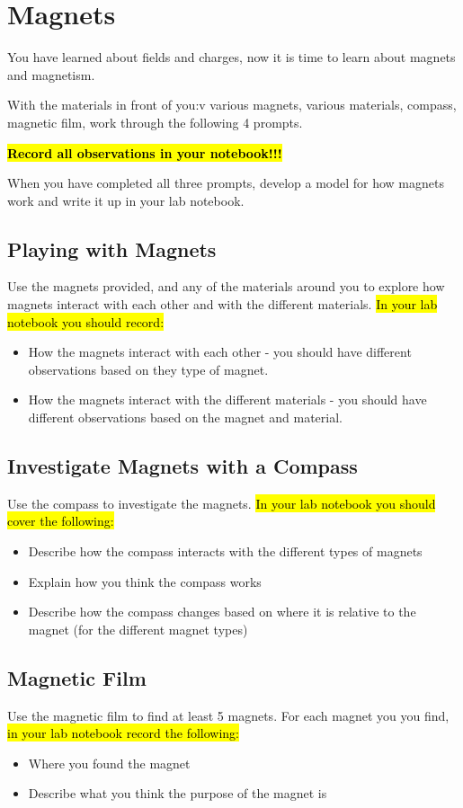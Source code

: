 \documentclass[14pt, fleqn, paper=letter, oneside]{scrartcl}
\begin{document}
\section{Magnets}
You have learned about fields and charges, now it is time to learn about magnets and magnetism.

With the materials in front of you:v
various magnets, various materials, compass, magnetic film,
work through the following 4 prompts.

\hl{\textbf{Record all observations in your notebook!!!}}

When you have completed all three prompts, develop a model for how magnets work and write it up in your lab notebook.

\begin{multicols}{2}

\subsection{Playing with Magnets}
Use the magnets provided, and any of the materials around you to explore how magnets interact with each other and with the different materials.
\hl{In your lab notebook you should record:}
\begin{itemize}
\item How the magnets interact with each other - you should have different observations based on they type of magnet.

\item How the magnets interact with the different materials - you should have different observations based on the magnet and material.
\end{itemize}

\subsection{Investigate Magnets with a Compass}
Use the compass to investigate the magnets.
\hl{In your lab notebook you should cover the following:}
\begin{itemize}
\item Describe how the compass interacts with the different types of magnets
\item Explain how you think the compass works
\item Describe how the compass changes based on where it is relative to the magnet (for the different magnet types)
\end{itemize}

\subsection{Magnetic Film}
Use the magnetic film to find at least 5 magnets.
For each magnet you you find,
\hl{in your lab notebook record the following:}
\begin{itemize}
\item Where you found the magnet
\item Describe what you think the purpose of the magnet is
\end{itemize}


\end{multicols}
\end{document}
